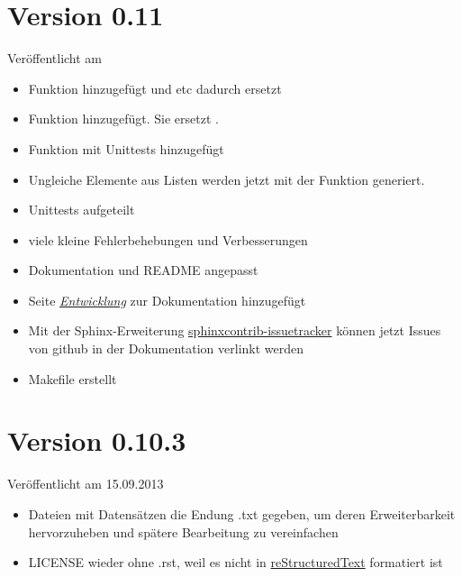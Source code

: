 \documentclass[a4paper,12pt,oneside]{sphinxmanual}
\begin{document}
\section{Version 0.11}
\label{changelog:version-0-11}
Veröffentlicht am
\begin{itemize}
\item {} 
Funktion {\hyperref[module:pyzufall.helfer.chance]{}} hinzugefügt und {\hyperref[module:pyzufall.helfer.e25]{}} etc dadurch ersetzt

\item {} 
Funktion {\hyperref[module:pyzufall.generator.interessen_liste]{}} hinzugefügt. Sie ersetzt {\hyperref[module:pyzufall.generator.interesse]{}}.

\item {} 
Funktion {\hyperref[module:pyzufall.helfer.str_add]{}} mit Unittests hinzugefügt \href{https://github.com/davidak/pyzufall/issues/14}{}

\item {} 
Ungleiche Elemente aus Listen werden jetzt mit der Funktion \href{http://docs.python.org/library/random.html\#random.sample}{} generiert.

\item {} 
Unittests aufgeteilt

\item {} 
viele kleine Fehlerbehebungen und Verbesserungen

\item {} 
Dokumentation und README angepasst

\item {} 
Seite {\hyperref[entwicklung::doc]{\emph{Entwicklung}}} zur Dokumentation hinzugefügt

\item {} 
Mit der Sphinx-Erweiterung \href{https://github.com/lunaryorn/sphinxcontrib-issuetracker}{sphinxcontrib-issuetracker} können jetzt Issues von github in der Dokumentation verlinkt werden

\item {} 
Makefile erstellt \href{https://github.com/davidak/pyzufall/issues/3}{}

\end{itemize}


\section{Version 0.10.3}
\label{changelog:version-0-10-3}
Veröffentlicht am 15.09.2013
\begin{itemize}
\item {} 
Dateien mit Datensätzen die Endung .txt gegeben, um deren Erweiterbarkeit hervorzuheben und spätere Bearbeitung zu vereinfachen

\item {} 
LICENSE wieder ohne .rst, weil es nicht in \href{http://de.wikipedia.org/wiki/ReStructuredText}{reStructuredText} formatiert ist

\end{itemize}
\end{document}
